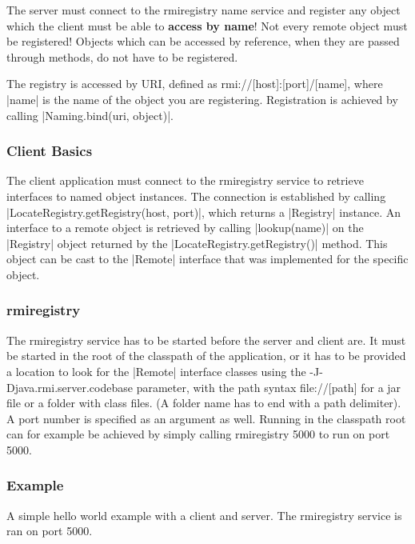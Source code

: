 \documentclass[a4paper]{article}
\begin{document}
The server must connect to the rmiregistry name service and register any object which the client must be able to \textbf{access by name}! Not every remote object must be registered! Objects which can be accessed by reference, when they are passed through methods, do not have to be registered.

The registry is accessed by URI, defined as {\small\ttfamily rmi://[host]:[port]/[name]}, where |name| is the name of the object you are registering. Registration is achieved by calling |Naming.bind(uri, object)|.

\subsubsection{Client Basics}

The client application must connect to the rmiregistry service to retrieve interfaces to named object instances. The connection is established by calling |LocateRegistry.getRegistry(host, port)|, which returns a |Registry| instance. An interface to a remote object is retrieved by calling |lookup(name)| on the |Registry| object returned by the |LocateRegistry.getRegistry()| method. This object can be cast to the |Remote| interface that was implemented for the specific object.

\subsubsection{rmiregistry}

The rmiregistry service has to be started before the server and client are. It must be started in the root of the classpath of the application, or it has to be provided a location to look for the |Remote| interface classes using the {\small\ttfamily -J-Djava.rmi.server.codebase} parameter, with the path syntax {\small\ttfamily file://[path]} for a jar file or a folder with class files. (A folder name has to end with a path delimiter). A port number is specified as an argument as well. Running in the classpath root can for example be achieved by simply calling {\small\ttfamily rmiregistry 5000} to run on port 5000.

\subsubsection{Example}

A simple hello world example with a client and server. The rmiregistry service is ran on port 5000.
\end{document}

